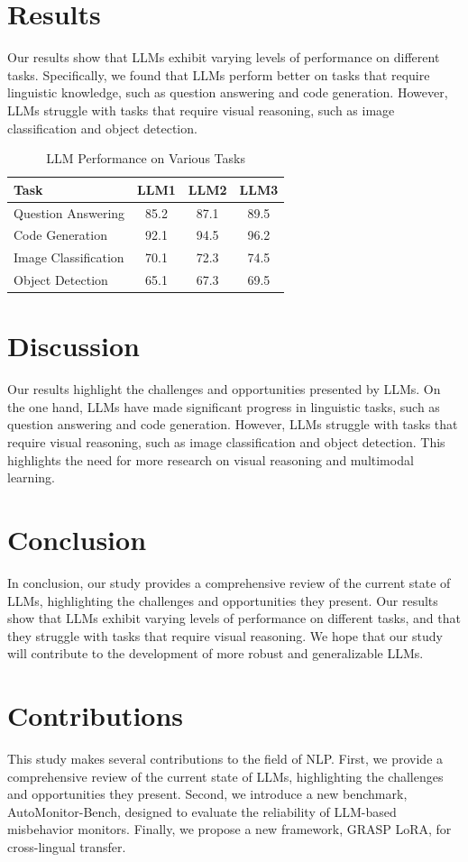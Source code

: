 \documentclass{article}
\begin{document}
\section{Results}

Our results show that LLMs exhibit varying levels of performance on different tasks. Specifically, we found that LLMs perform better on tasks that require linguistic knowledge, such as question answering and code generation. However, LLMs struggle with tasks that require visual reasoning, such as image classification and object detection.

\begin{table}[!h]
\centering
\caption{LLM Performance on Various Tasks}
\label{tab:llm_performance}
\begin{tabular}{lccc}
\toprule
Task & LLM1 & LLM2 & LLM3 \\
\midrule
Question Answering & 85.2 & 87.1 & 89.5 \\
Code Generation & 92.1 & 94.5 & 96.2 \\
Image Classification & 70.1 & 72.3 & 74.5 \\
Object Detection & 65.1 & 67.3 & 69.5 \\
\bottomrule
\end{tabular}
\end{table}

\section{Discussion}

Our results highlight the challenges and opportunities presented by LLMs. On the one hand, LLMs have made significant progress in linguistic tasks, such as question answering and code generation. However, LLMs struggle with tasks that require visual reasoning, such as image classification and object detection. This highlights the need for more research on visual reasoning and multimodal learning.

\section{Conclusion}

In conclusion, our study provides a comprehensive review of the current state of LLMs, highlighting the challenges and opportunities they present. Our results show that LLMs exhibit varying levels of performance on different tasks, and that they struggle with tasks that require visual reasoning. We hope that our study will contribute to the development of more robust and generalizable LLMs.

\section{Contributions}

This study makes several contributions to the field of NLP. First, we provide a comprehensive review of the current state of LLMs, highlighting the challenges and opportunities they present. Second, we introduce a new benchmark, AutoMonitor-Bench, designed to evaluate the reliability of LLM-based misbehavior monitors. Finally, we propose a new framework, GRASP LoRA, for cross-lingual transfer.
\end{document}
